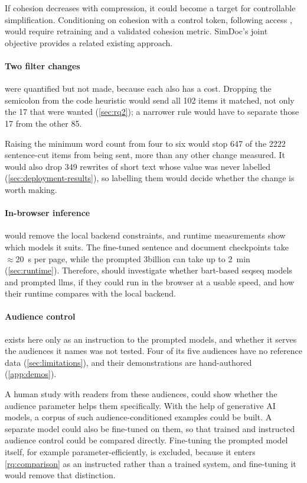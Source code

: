 If cohesion decreases with compression, it could become a target for controllable simplification. Conditioning on cohesion with a control token, following \gls{access} \parencite[4691]{martin-etal-2020-controllable}, would require retraining and a validated cohesion metric.
SimDoc's joint objective \parencite[1]{vasquezrodriguez2024simple} provides a related existing approach.

\paragraph{Two filter changes} were quantified but not made, because each also has a cost.
Dropping the semicolon from the code heuristic would send all \num{102} items it matched, not only the 17 that were wanted (\cref{sec:rq2}); a narrower rule would have to separate those 17 from the other 85.

Raising the minimum word count from four to six would stop \num{647} of the \num{2222} sentence-cut items from being sent, more than any other change measured.
It would also drop \num{349} rewrites of short text whose value was never labelled (\cref{sec:deployment-results}), so labelling them would decide whether the change is worth making.

\paragraph{In-browser inference} would remove the local backend constraints, and runtime measurements show which models it suits.
The fine-tuned sentence and document checkpoints take \(\approx\)\qty{20}{\second} per page, while the prompted 3\gls{billion} can take up to \qty{2}{\minute} (\cref{sec:runtime}).
Therefore, should investigate whether \gls{bart}-based \gls{seqseq} models and prompted \glspl{llm}, if they could run in the browser at a usable speed, and how their runtime compares with the local backend.

\paragraph{Audience control} exists here only as an instruction to the prompted models, and whether it serves the audiences it names was not tested.
Four of its five audiences have no reference data (\cref{sec:limitations}), and their demonstrations are hand-authored (\cref{app:demos}).

A human study with readers from these audiences, could show whether the audience parameter helps them specifically.
With the help of generative AI models, a corpus of such audience-conditioned examples could be built.
A separate model could also be fine-tuned on them, so that trained and instructed audience control could be compared directly.
Fine-tuning the prompted model itself, for example parameter-efficiently, is excluded, because it enters \cref{rq:comparison} as an instructed rather than a trained system, and fine-tuning it would remove that distinction.
